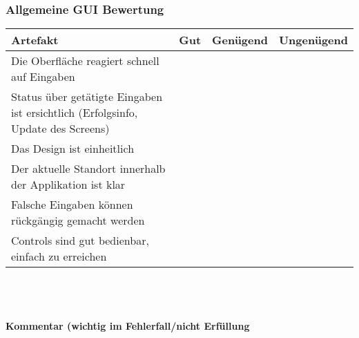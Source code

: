 \documentclass[10pt,a4paper]{scrartcl}
\begin{document}
\subsubsection*{Allgemeine GUI Bewertung}
\begin{tabular}{|l|c|c|c|}
\hline 
\rule[-1ex]{0pt}{2.5ex} \textbf{Artefakt} & \textbf{Gut} & \textbf{Genügend} & \textbf{Ungenügend} \\ 
\hline 
\rule[-1ex]{0pt}{2.5ex} Die Oberfläche reagiert schnell auf Eingaben &  &  &  \\ 
\hline 
\rule[-1ex]{0pt}{2.5ex} Status über getätigte Eingaben ist ersichtlich (Erfolgsinfo, Update des Screens) &  &  &  \\ 
\hline 
\rule[-1ex]{0pt}{2.5ex} Das Design ist einheitlich &  &  &  \\ 
\hline 
\rule[-1ex]{0pt}{2.5ex} Der aktuelle Standort innerhalb der Applikation ist klar &  &  &  \\ 
\hline 
\rule[-1ex]{0pt}{2.5ex} Falsche Eingaben können rückgängig gemacht werden &  &  &  \\ 
\hline 
\rule[-1ex]{0pt}{2.5ex} Controls sind gut bedienbar, einfach zu erreichen &  &  &  \\  
\hline 
\end{tabular} 
\\
\\
\\
\textbf{Kommentar (wichtig im Fehlerfall/nicht Erfüllung}
\vspace*{8cm}
\end{document}
